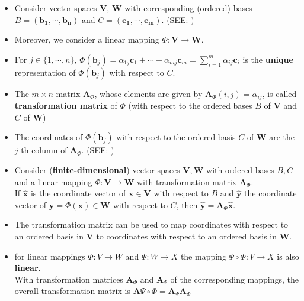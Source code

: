 \begin{itemize}
    \item Consider vector spaces $\mathbf{V}$, $\mathbf{W}$ with corresponding (ordered) bases $\mathit{B} = \mathbf{(b_1, \cdots , b_n)}$ and $\mathit{C} = \mathbf{(c_1, \cdots , c_m)}$. (SEE: )

    \item Moreover, we consider a linear mapping $\Phi : \mathbf{V} \to \mathbf{W}$. 

    \item For $j \in \{1, \cdots , n\}$, \(     \displaystyle \Phi(\mathbf{b}_j) = \alpha_{1j}\mathbf{c}_1 + \cdots + \alpha_{mj}\mathbf{c}_m = \sum_{i=1}^{m} \alpha_{ij}\mathbf{c}_{i} \) is the \textbf{unique} representation of $\Phi(\mathbf{b}_j)$ with respect to $\mathit{C}$. 

    \item The $m \times n$-matrix $\mathbf{A}_\Phi$, whose elements are given by \( \mathbf{A}_\Phi(i, j) = \alpha_{ij} \), is called \textbf{transformation matrix} of $\Phi$ (with respect to the ordered bases $\mathit{B}$ of $\mathbf{V}$ and $\mathit{C}$ of $\mathbf{W}$)

    \item The coordinates of $\Phi(\mathbf{b}_j)$ with respect to the ordered basis $\mathit{C}$ of $\mathbf{W}$ are the $j$-th column of $\mathbf{A}_\Phi$. (SEE: )

    \item Consider (\textbf{finite-dimensional}) vector spaces $\mathbf{V, W}$ with ordered bases $\mathit{B, C}$ and a linear mapping $\Phi : \mathbf{V \to W}$ with transformation matrix $\mathbf{A}_\Phi$. \\
    If $\hat{\mathbf{x}}$ is the coordinate vector of $\mathbf{x} \in \mathbf{V}$ with respect to $\mathit{B}$ and $\hat{\mathbf{y}}$ the coordinate vector of $\mathbf{y} = \Phi(\mathbf{x}) \in \mathbf{W}$ with respect to $\mathit{C}$, then $\hat{\mathbf{y}} = \mathbf{A}_\Phi\hat{\mathbf{x}}$.

    \item The transformation matrix can be used to map coordinates with respect to an ordered basis in $\mathbf{V}$ to coordinates with respect to an ordered basis in $\mathbf{W}$.

    \item for linear mappings $\Phi : V \to W$ and $\Psi : W \to X$ the mapping $\Psi \circ \Phi : V \to X$ is also \textbf{linear}.\\
    With transformation matrices $\mathbf{A}_\Phi$ and $\mathbf{A}_\Psi$ of the corresponding mappings, the overall transformation matrix is $\mathbf{A}\Psi\circ\Phi = \mathbf{A}_\Psi \mathbf{A}_\Phi$


\end{itemize}
